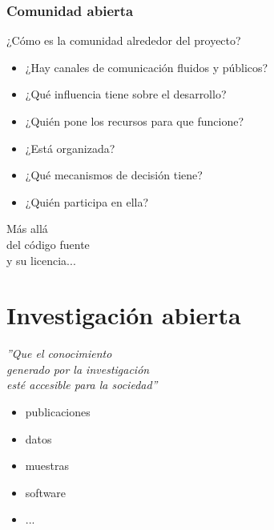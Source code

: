 \documentclass[17pt,aspectratio=169]{beamer}
\begin{document}

\begin{frame}
\frametitle{Comunidad abierta}

¿Cómo es la comunidad alrededor del proyecto?

\begin{itemize}
\item ¿Hay canales de comunicación fluidos y públicos?
\item ¿Qué influencia tiene sobre el desarrollo?
\item ¿Quién pone los recursos para que funcione?
\item ¿Está organizada?
\item ¿Qué mecanismos de decisión tiene?
\item ¿Quién participa en ella?
\end{itemize}

\end{frame}

\begin{frame}

  \begin{center}
    {\Huge Más allá\\ del código fuente\\ y su licencia...\\}
  \end{center}

\end{frame}

\section{Investigación abierta}

\begin{frame}

  \begin{center}
    {\Large \em''Que el conocimiento\\
      generado por la investigación\\
      esté accesible para la sociedad''\\}
  \end{center}

  \begin{itemize}
  \item publicaciones
  \item datos
  \item muestras
  \item software
  \item ...
  \end{itemize}

\end{frame}
\end{document}
